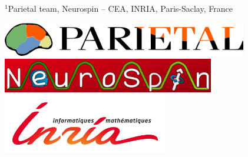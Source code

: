 \documentclass[portrait,a0,final]{a0poster} %
\begin{document}
\begin{minipage}[t]{0.98\linewidth}
\begin{minipage}[t]{0.95\linewidth}
\vspace{0.01\linewidth}
\Large{\textcolor{posterBlack}{\textsf{%
            $^1$Parietal team, Neurospin -- CEA, INRIA, Paris-Saclay, France%
}}}
%
\end{minipage}
\begin{minipage}{0.76\paperwidth}
\vspace{-0.035\linewidth}
\begin{flushright}
\includegraphics[height=15mm, angle=0]{figures/logos/parietal_web_page.png}
\qquad \quad
\includegraphics[height=15mm, angle=0]{figures/logos/neurospin.jpg}
\qquad \quad
\includegraphics[height=26mm, angle=0]{figures/logos/logo-inria2.jpg}
\end{flushright}
\end{minipage} %


\end{minipage}


\vspace{0.01\linewidth}

\centering
\Large %
\sffamily %
\end{document}
